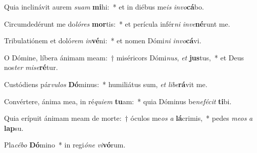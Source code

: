 \item Quia inclinávit aurem \textit{su}\textit{am} \textbf{mi}hi:~* et in diébus me\textit{is} \textit{in}\textit{vo}\textbf{cá}bo.
\item Circumdedérunt me do\textit{ló}\textit{res} \textbf{mor}tis:~* et perícula infér\textit{ni} \textit{in}\textit{ve}\textbf{né}runt me.
\item Tribulatiónem et doló\textit{rem} \textit{in}\textbf{vé}ni:~* et nomen Dómi\textit{ni} \textit{in}\textit{vo}\textbf{cá}vi.
\item O Dómine, líbera ánimam meam:~† miséricors Dómi\textit{nus}, \textit{et} \textbf{jus}tus,~* et Deus nos\textit{ter} \textit{mi}\textit{se}\textbf{ré}tur.
\item Custódiens pár\textit{vu}\textit{los} \textbf{Dó}minus:~* humiliátus sum, \textit{et} \textit{li}\textit{be}\textbf{rá}vit me.
\item Convértere, ánima mea, in ré\textit{qui}\textit{em} \textbf{tu}am:~* quia Dóminus be\textit{ne}\textit{fé}\textit{cit} \textbf{ti}bi.
\item Quia erípuit ánimam meam de morte:~† óculos me\textit{os} \textit{a} \textbf{lá}crimis,~* pedes \textit{me}\textit{os} \textit{a} \textbf{lap}su.
\item Pla\textit{cé}\textit{bo} \textbf{Dó}mino~* in regi\textit{ó}\textit{ne} \textit{vi}\textbf{vó}rum.
